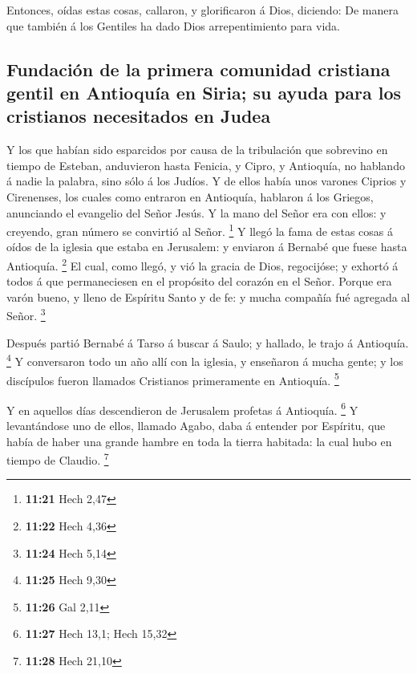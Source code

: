  Entonces, oídas estas cosas, callaron, y glorificaron á
Dios, diciendo: De manera que también á los Gentiles ha dado Dios
arrepentimiento para vida.

\hypertarget{fundaciuxf3n-de-la-primera-comunidad-cristiana-gentil-en-antioquuxeda-en-siria-su-ayuda-para-los-cristianos-necesitados-en-judea}{%
\subsection{Fundación de la primera comunidad cristiana gentil en
Antioquía en Siria; su ayuda para los cristianos necesitados en
Judea}\label{fundaciuxf3n-de-la-primera-comunidad-cristiana-gentil-en-antioquuxeda-en-siria-su-ayuda-para-los-cristianos-necesitados-en-judea}}

 Y los que habían sido esparcidos por causa de la
tribulación que sobrevino en tiempo de Esteban, anduvieron hasta
Fenicia, y Cipro, y Antioquía, no hablando á nadie la palabra, sino sólo
á los Judíos.  Y de ellos había unos varones Ciprios y
Cirenenses, los cuales como entraron en Antioquía, hablaron á los
Griegos, anunciando el evangelio del Señor Jesús.  Y la
mano del Señor era con ellos: y creyendo, gran número se convirtió al
Señor. \footnote{\textbf{11:21} Hech 2,47}  Y llegó la fama
de estas cosas á oídos de la iglesia que estaba en Jerusalem: y enviaron
á Bernabé que fuese hasta Antioquía. \footnote{\textbf{11:22} Hech 4,36}
 El cual, como llegó, y vió la gracia de Dios, regocijóse;
y exhortó á todos á que permaneciesen en el propósito del corazón en el
Señor.  Porque era varón bueno, y lleno de Espíritu Santo y
de fe: y mucha compañía fué agregada al Señor. \footnote{\textbf{11:24}
  Hech 5,14}

 Después partió Bernabé á Tarso á buscar á Saulo; y
hallado, le trajo á Antioquía. \footnote{\textbf{11:25} Hech 9,30}
 Y conversaron todo un año allí con la iglesia, y enseñaron
á mucha gente; y los discípulos fueron llamados Cristianos primeramente
en Antioquía. \footnote{\textbf{11:26} Gal 2,11}

 Y en aquellos días descendieron de Jerusalem profetas á
Antioquía. \footnote{\textbf{11:27} Hech 13,1; Hech 15,32} 
Y levantándose uno de ellos, llamado Agabo, daba á entender por
Espíritu, que había de haber una grande hambre en toda la tierra
habitada: la cual hubo en tiempo de Claudio. \footnote{\textbf{11:28}
  Hech 21,10}

